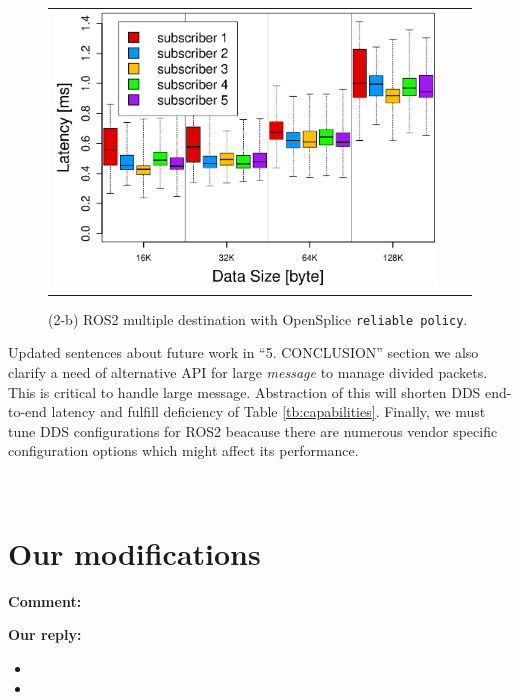 \documentclass{article}
\begin{document}
\begin{enumerate}
\begin{figure}[h]
\begin{tabular}{ccc}
\begin{minipage}[t]{0.31\textwidth}
        \includegraphics[width=1.0\linewidth]{../../figure/BoxPlot_ospl_128K_multi-pub5.eps}
        \caption{(2-b) ROS2 multiple destination with OpenSplice \texttt{reliable policy}.}
        \label{fig:ospl_multi_128K}
      \end{minipage}
    \end{tabular}
  \end{figure}
  \begin{itembox}[|]{Updated sentences about future work in ``5. CONCLUSION'' section}
    we also clarify a need of alternative API for large \emph{message} to manage divided packets.
    This is critical to handle large message.
    Abstraction of this will shorten DDS end-to-end latency and fulfill deficiency of Table \ref{tb:capabilities}.
    Finally, we must tune DDS configurations for ROS2 beacause there are numerous vendor specific configuration options which might affect its performance.
  \end{itembox}\\




\end{enumerate}

\newpage


\section{Our modifications}

\begin{flushleft}
  \textbf{Comment:}
\end{flushleft}

\begin{flushleft}
  \textbf{Our reply:}
\end{flushleft}

\begin{itemize}
\item 
\item
\end{itemize}
\end{document}
